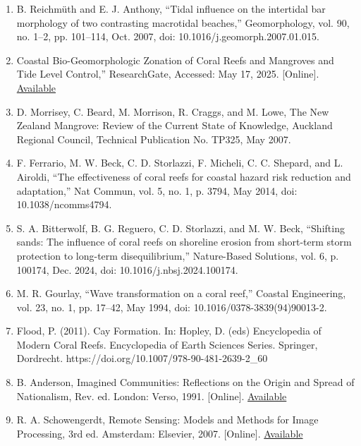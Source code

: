 \documentclass{article}
\begin{document}
{\begin{enumerate}
    \item{B. Reichmüth and E. J. Anthony, “Tidal influence on the intertidal bar morphology of two contrasting macrotidal beaches,” Geomorphology, vol. 90, no. 1–2, pp. 101–114, Oct. 2007, doi: 10.1016/j.geomorph.2007.01.015.}

    \item{Coastal Bio-Geomorphologic Zonation of Coral Reefs and Mangroves and Tide Level Control,” ResearchGate, Accessed: May 17, 2025. [Online]. \href{https://www.researchgate.net/publication/266092059_Coastal_Bio-Geomorphologic_Zonation_of_Coral_Reefs_and_Mangroves_and_Tide_Level_Control}{Available}}

    \item{D. Morrisey, C. Beard, M. Morrison, R. Craggs, and M. Lowe, The New Zealand Mangrove: Review of the Current State of Knowledge, Auckland Regional Council, Technical Publication No. TP325, May 2007.}

    \item{F. Ferrario, M. W. Beck, C. D. Storlazzi, F. Micheli, C. C. Shepard, and L. Airoldi, “The effectiveness of coral reefs for coastal hazard risk reduction and adaptation,” Nat Commun, vol. 5, no. 1, p. 3794, May 2014, doi: 10.1038/ncomms4794.}

    \item{S. A. Bitterwolf, B. G. Reguero, C. D. Storlazzi, and M. W. Beck, “Shifting sands: The influence of coral reefs on shoreline erosion from short-term storm protection to long-term disequilibrium,” Nature-Based Solutions, vol. 6, p. 100174, Dec. 2024, doi: 10.1016/j.nbsj.2024.100174.}

    \item{M. R. Gourlay, “Wave transformation on a coral reef,” Coastal Engineering, vol. 23, no. 1, pp. 17–42, May 1994, doi: 10.1016/0378-3839(94)90013-2.}

    \item{Flood, P. (2011). Cay Formation. In: Hopley, D. (eds) Encyclopedia of Modern Coral Reefs. Encyclopedia of Earth Sciences Series. Springer, Dordrecht. https://doi.org/10.1007/978-90-481-2639-2_60}

    \item{B. Anderson, Imagined Communities: Reflections on the Origin and Spread of Nationalism, Rev. ed. London: Verso, 1991. [Online]. \href{https://search.worldcat.org/title/880118890}{Available}}

    \item{R. A. Schowengerdt, Remote Sensing: Models and Methods for Image Processing, 3rd ed. Amsterdam: Elsevier, 2007. [Online]. \href{https://books.google.com/books?id=KQXNaDH0X-IC&pg=PA2}{Available}}


\end{enumerate}}
\end{document}
